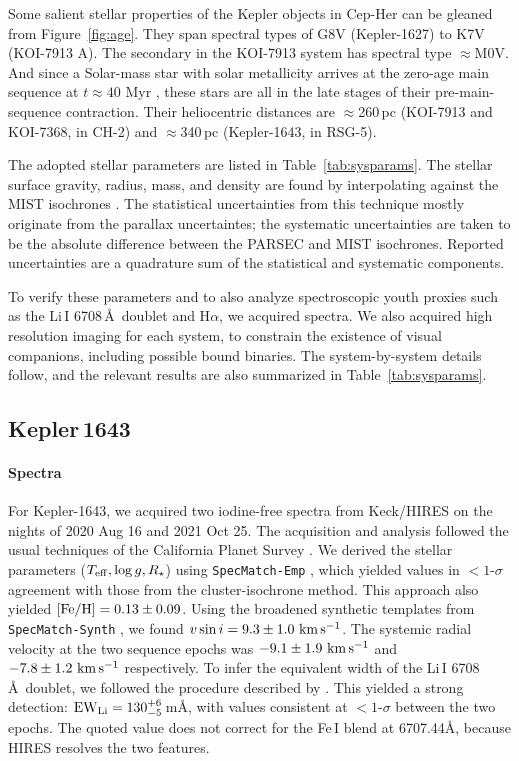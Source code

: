 \documentclass[12pt,twocolumn,linenumbers]{aastex63}
\newcommand{\mkms}{{\rm \,km\,s^{-1}}}  %
\begin{document}


Some salient stellar properties of the Kepler objects in Cep-Her can be gleaned
from Figure~\ref{fig:age}.  They span spectral types of G8V
(Kepler-1627) to K7V (KOI-7913 A).  The secondary in the KOI-7913
system has spectral type $\approx$M0V.  And since a
Solar-mass star with solar metallicity arrives at the zero-age main
sequence at $t\approx40$ Myr \citep{choi_mesa_2016}, these
stars are all in the late stages of their pre-main-sequence
contraction.  Their heliocentric distances are $\approx$260\,pc
(KOI-7913 and KOI-7368, in CH-2) and $\approx$340\,pc (Kepler-1643, in
RSG-5).

The adopted stellar parameters are listed in
Table~\ref{tab:sysparams}.  The stellar surface gravity, radius,
mass, and density are found by interpolating against the MIST
isochrones \citep{choi_mesa_2016}.  The statistical uncertainties from
this technique mostly originate from the parallax uncertaintes; the
systematic uncertainties are taken to be the absolute difference
between the PARSEC \citep{bressan_parsec_2012} and MIST isochrones.
Reported uncertainties are a quadrature sum of the statistical and
systematic components. 

To verify these parameters and to also analyze spectroscopic youth
proxies such as the Li\,\textsc{I} 6708\,\AA\ doublet and H$\alpha$,
we acquired spectra.  We also acquired high resolution imaging for
each system, to constrain the existence of visual companions,
including possible bound binaries.  The system-by-system details
follow, and the relevant results are also summarized in
Table~\ref{tab:sysparams}.

\subsection{Kepler\,1643}

\paragraph{Spectra}
For Kepler-1643, we acquired two iodine-free spectra from Keck/HIRES
on the nights of 2020 Aug 16 and 2021 Oct 25.  The acquisition
and analysis followed the usual techniques of the
California Planet Survey \citep{howard_cps_2010}.  We derived the
stellar parameters ($T_{\rm eff}, \log g, R_\star$) using
\texttt{SpecMatch-Emp} \citep{yee_SM_2017}, which yielded values in
$<1$-$\sigma$ agreement with those from the cluster-isochrone
method.  This approach also yielded $[{\rm Fe/H}]=0.13 \pm 0.09$.
Using the broadened synthetic templates from \texttt{SpecMatch-Synth}
\citep{petigura_cksi_2017}, we found $v\sin i = 9.3 \pm 1.0\,\mkms$.
The systemic radial velocity at the two sequence epochs was $-9.1 \pm
1.9\,\mkms$ and $-7.8\pm 1.2\,\mkms$ respectively.  To infer the
equivalent width of the Li\,\textsc{I} 6708\,\AA\ doublet, we followed
the procedure described by \citet{bouma_2021_ngc2516}.  This yielded a
strong detection: ${\rm EW}_{\rm Li} = 130^{+6}_{-5}$\,m\AA, with
values consistent at $<1$-$\sigma$ between the two epochs.   The
quoted value does not correct for the Fe\,\textsc{I} blend at
6707.44\AA, because HIRES resolves the two
features.  
\end{document}

